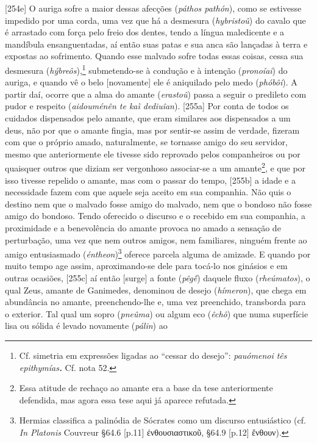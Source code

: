 {[}254e{]} O auriga sofre a maior dessas afecções (\emph{páthos
pathón}), como se estivesse impedido por uma corda, uma vez que há a
desmesura (\emph{hybristoû}) do cavalo que é arrastado com força pelo
freio dos dentes, tendo a língua maledicente e a mandíbula
ensanguentadas, aí então suas patas e sua anca são lançadas à terra e
expostas ao sofrimento. Quando esse malvado sofre todas essas coisas,
cessa sua desmesura (\emph{hýbreôs}),\footnote{Cf. simetria em
  expressões ligadas ao ``cessar do desejo'': \emph{pauómenoi tês
  epithymías\textbf{. }}Cf. nota 52.} submetendo-se à condução e à
intenção (\emph{pronoíai}) do auriga, e quando vê o belo {[}novamente{]}
ele é aniquilado pelo medo (\emph{phóbôi}). A partir daí, ocorre que a
alma do amante (\emph{erastoû}) passa a seguir o predileto com pudor e
respeito (\emph{aidouménên te kaì dediuîan}). {[}255a{]} Por conta de
todos os cuidados dispensados pelo amante, que eram similares aos
dispensados a um deus, não por que o amante fingia, mas por sentir-se
assim de verdade, fizeram com que o próprio amado, naturalmente, se
tornasse amigo do seu servidor, mesmo que anteriormente ele tivesse sido
reprovado pelos companheiros ou por quaisquer outros que diziam ser
vergonhoso associar-se a um amante\footnote{Essa atitude de rechaço ao
  amante era a base da tese anteriormente defendida, mas agora essa tese
  aqui já aparece refutada.}, e que por isso tivesse repelido o amante,
mas com o passar do tempo, {[}255b{]} a idade e a necessidade fazem com
que aquele seja aceito em sua companhia. Não quis o destino nem que o
malvado fosse amigo do malvado, nem que o bondoso não fosse amigo do
bondoso. Tendo oferecido o discurso e o recebido em sua companhia, a
proximidade e a benevolência do amante provoca no amado a sensação de
perturbação, uma vez que nem outros amigos, nem familiares, ninguém
frente ao amigo entusiasmado (\emph{éntheon})\footnote{Hermias
  classifica a palinódia de Sócrates como um discurso entusiástico (cf.
  \emph{In Platonis} Couvreur §64.6 {[}p.11{]} ἐνθουσιαστικοῦ, §64.9
  {[}p.12{]} ἔνθουν).} oferece parcela alguma de amizade. E quando por
muito tempo age assim, aproximando-se dele para tocá-lo nos ginásios e
em outras ocasiões, {[}255c{]} aí então {[}surge{]} a fonte
(\emph{pêgḗ}) daquele fluxo (\emph{rheúmatos}), o qual Zeus, amante de
Ganimedes, denominou de desejo (\emph{hímeron}), que chega em abundância
no amante, preenchendo-lhe e, uma vez preenchido, transborda para o
exterior. Tal qual um sopro (\emph{pneûma}) ou algum eco (\emph{êchô})
que numa superfície lisa ou sólida é levado novamente (\emph{pálin}) ao
